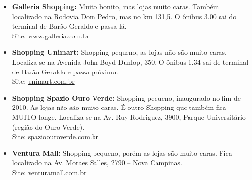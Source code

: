\begin{itemize}
    \item   \textbf{Galleria Shopping:} Muito bonito, mas lojas muito caras.
        Também localizado na Rodovia Dom Pedro, mas no km 131,5. O ônibus 3.00
        sai do terminal de Barão Geraldo e passa lá.
        \\Site: \url{www.galleria.com.br}

    \item   \textbf{Shopping Unimart:} Shopping pequeno, as lojas não são muito
        caras. Localiza-se na Avenida John Boyd Dunlop, 350. O ônibus 1.34 sai
        do terminal de Barão Geraldo e passa próximo.
        \\Site: \url{unimart.com.br}
    
    \item   \textbf{Shopping Spazio Ouro Verde:} Shopping pequeno, inaugurado 
        no fim de 2010. As lojas não são muito caras. É outro Shopping que 
        também fica MUITO longe. Localiza-se na Av. Ruy Rodriguez, 3900, 
        Parque Universitário (região do Ouro Verde).
        \\Site: \url{spazioouroverde.com.br}

    \item   \textbf{Ventura Mall:} Shopping pequeno, porém as lojas são muito caras.
        Fica localizado na Av. Moraes Salles, 2790 -- Nova Campinas.
        \\Site: \url{venturamall.com.br}
\end{itemize}
